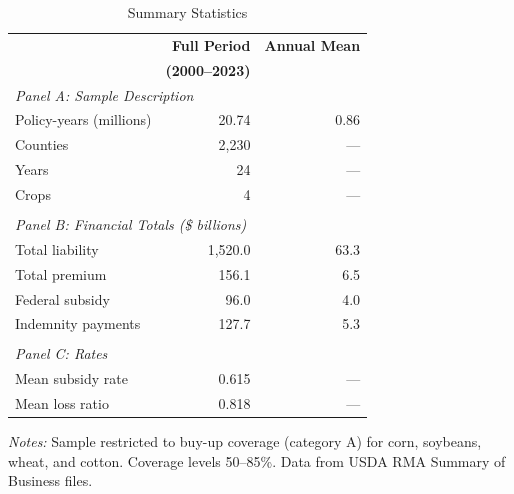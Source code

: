 \begin{table}[htbp]
\centering
\caption{Summary Statistics}
\label{tab:summary}
\begin{threeparttable}
\begin{tabular}{lrr}
\toprule
& \textbf{Full Period} & \textbf{Annual Mean} \\
& \textbf{(2000--2023)} & \\
\midrule
\multicolumn{3}{l}{\textit{Panel A: Sample Description}} \\[3pt]
Policy-years (millions) & 20.74 & 0.86 \\
Counties & 2,230 & --- \\
Years & 24 & --- \\
Crops & 4 & --- \\
\\
\multicolumn{3}{l}{\textit{Panel B: Financial Totals (\$ billions)}} \\[3pt]
Total liability & 1,520.0 & 63.3 \\
Total premium & 156.1 & 6.5 \\
Federal subsidy & 96.0 & 4.0 \\
Indemnity payments & 127.7 & 5.3 \\
\\
\multicolumn{3}{l}{\textit{Panel C: Rates}} \\[3pt]
Mean subsidy rate & 0.615 & --- \\
Mean loss ratio & 0.818 & --- \\
\bottomrule
\end{tabular}
\begin{tablenotes}[flushleft]
\footnotesize
\item \textit{Notes:} Sample restricted to buy-up coverage (category A) for corn, soybeans, wheat, and cotton. Coverage levels 50--85\%. Data from USDA RMA Summary of Business files.
\end{tablenotes}
\end{threeparttable}
\end{table}
